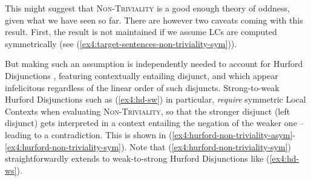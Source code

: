 This might suggest that \textsc{Non-Triviality} is a good enough theory of oddness, given what we have seen so far. There are however two caveats coming with this result. First, the result is not maintained if we assume LCs are computed symmetrically (see (\ref{ex4:target-sentences-non-triviality-sym})). 

\begin{exe}
	\label{ex4:target-sentences-non-triviality-sym}
\end{exe}

But making such an assumption is independently needed to account for Hurford Disjunctions \parencite{Hurford1974}, featuring contextually entailing disjunct, and which appear infelicitous regardless of the linear order of such disjuncts. Strong-to-weak Hurford Disjunctions such as (\ref{ex4:hd-sw}) in particular, \textit{require} symmetric Local Contexts when evaluating \textsc{Non-Triviality}, so that the stronger disjunct (left disjunct) gets interpreted in a context entailing the negation of the weaker one -- leading to a contradiction. This is shown in (\ref{ex4:hurford-non-triviality-asym}-\ref{ex4:hurford-non-triviality-sym}). Note that (\ref{ex4:hurford-non-triviality-sym}) straightforwardly extends to weak-to-strong Hurford Disjunctions like (\ref{ex4:hd-ws}).

\begin{exe}
	\ex \label{ex4:hd}
	\begin{xlist}
		\label{ex4:hd-sw}
		\label{ex4:hd-ws}
	\end{xlist}
\end{exe}

\begin{exe}
	\label{ex4:hurford-non-triviality-asym}
	\label{ex4:hurford-non-triviality-sym}
\end{exe}

